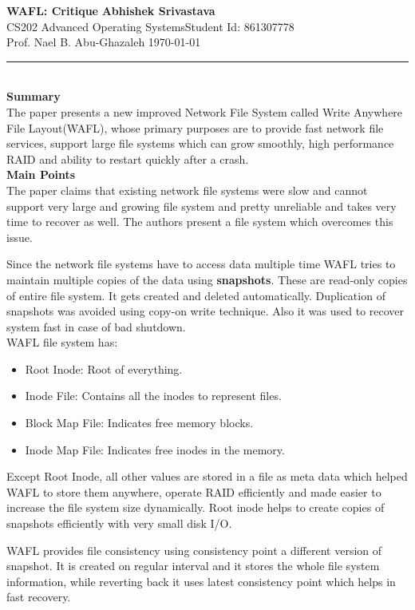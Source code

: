 \documentclass[a4paper, 10pt]{article}
\begin{document}
\noindent
\large\textbf{WAFL: Critique} \hfill \textbf{Abhishek Srivastava} \\
\normalsize CS202 Advanced Operating Systems\hfill Student Id: 861307778 \\
Prof. Nael B. Abu-Ghazaleh \hfill \today \\
\hrule

\noindent
\\
\large\textbf{Summary}\\
The paper presents a new improved Network File System called Write Anywhere File Layout(WAFL), whose primary purposes are to provide fast network file services, support large file systems which can grow smoothly, high performance RAID and ability to restart quickly after a crash.\\

\noindent
\large\textbf{Main Points}\\
The paper claims that existing network file systems were slow and cannot support very large and growing file system and pretty unreliable and takes very time to recover as well. The authors present a file system which overcomes this issue.

Since the network file systems have to access data multiple time WAFL tries to maintain multiple copies of the data using \textbf{snapshots}. These are read-only copies of entire file system. It gets created and deleted automatically. Duplication of snapshots was avoided using copy-on write technique. Also it was used to recover system fast in case of bad shutdown.\\

WAFL file system has:
\begin{itemize}
	\item Root Inode: Root of everything. 
	\item Inode File: Contains all the inodes to represent files.
	\item Block Map File: Indicates free memory blocks.
	\item Inode Map File: Indicates free inodes in the memory.
\end{itemize}
Except Root Inode, all other values are stored in a file as meta data which helped WAFL to store them anywhere, operate RAID efficiently and made easier to increase the file system size dynamically. Root inode helps to create copies of snapshots efficiently with very small disk I/O.

WAFL provides file consistency using consistency point a different version of snapshot. It is created on regular interval and it stores the whole file system information, while reverting back it uses latest consistency point which helps in fast recovery.
\end{document}
